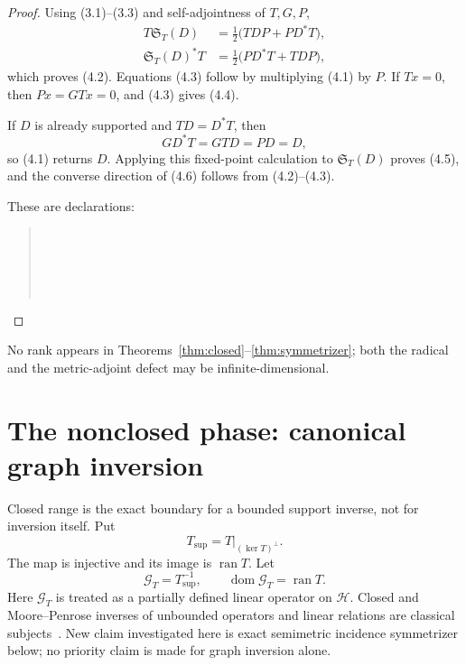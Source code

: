 \documentclass[11pt]{article}
\theoremstyle{definition}
\theoremstyle{remark}
\newcommand{\Hh}{\mathcal H}
\newcommand{\ran}{\operatorname{ran}}
\newcommand{\kerop}{\operatorname{ker}}
\begin{document}
\begin{proof}
Using (3.1)--(3.3) and self-adjointness of $T,G,P$,
\begin{align*}
 T\mathfrak S_T(D)
 &=\tfrac12\bigl(TDP+PD^*T\bigr),\\
 \mathfrak S_T(D)^*T
 &=\tfrac12\bigl(PD^*T+TDP\bigr),
\end{align*}
which proves (4.2).  Equations (4.3) follow by multiplying (4.1) by $P$.  If $Tx=0$, then
$Px=GTx=0$, and (4.3) gives (4.4).

If $D$ is already supported and $TD=D^*T$, then
\[
 GD^*T=GTD=PD=D,
\]
so (4.1) returns $D$.  Applying this fixed-point calculation to $\mathfrak S_T(D)$ proves
(4.5), and the converse direction of (4.6) follows from (4.2)--(4.3).

These are declarations:
\begin{quote}\footnotesize
{}\\
\\
\\
\\
\end{quote}
\end{proof}

No rank appears in Theorems~\ref{thm:closed}--\ref{thm:symmetrizer}; both the radical and the
metric-adjoint defect may be infinite-dimensional.

\section{The nonclosed phase: canonical graph inversion}

Closed range is the exact boundary for a bounded support inverse, not for inversion itself.  Put
\[
 T_{\mathrm{sup}}=T|_{(\kerop T)^\perp}.
\]
The map is injective and its image is $\ran T$.  Let
\[
 \mathcal G_T=T_{\mathrm{sup}}^{-1},\qquad
 \operatorname{dom}\mathcal G_T=\ran T.                  \tag{5.1}
\]
Here $\mathcal G_T$ is treated as a partially defined linear operator on $\Hh$.
Closed and Moore--Penrose inverses of unbounded operators and linear relations are classical
subjects~\cite{MJ2024,M2025,KR2015}.  New claim investigated here is exact semimetric incidence
symmetrizer below; no priority claim is made for graph inversion alone.
\end{document}
